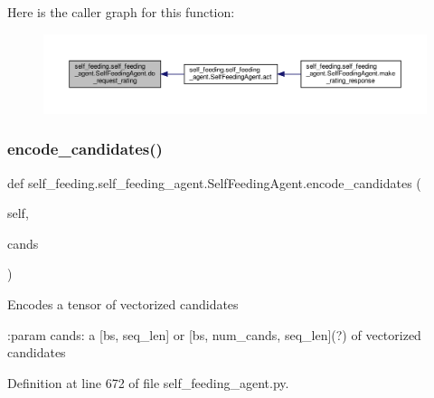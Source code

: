 Here is the caller graph for this function\+:
\nopagebreak
\begin{figure}[H]
\begin{center}
\leavevmode
\includegraphics[width=350pt]{classself__feeding_1_1self__feeding__agent_1_1SelfFeedingAgent_ab0ccbaba9de0874d235a2ce14dd8ead3_icgraph}
\end{center}
\end{figure}
\mbox{\label{classself__feeding_1_1self__feeding__agent_1_1SelfFeedingAgent_ae156bc0076ea687e2d29cb2d1986b5db}} 
\subsubsection{\texorpdfstring{encode\+\_\+candidates()}{encode\_candidates()}}
{\footnotesize\ttfamily def self\+\_\+feeding.\+self\+\_\+feeding\+\_\+agent.\+Self\+Feeding\+Agent.\+encode\+\_\+candidates (\begin{DoxyParamCaption}\item[{}]{self,  }\item[{}]{cands }\end{DoxyParamCaption})}

\begin{DoxyVerb}Encodes a tensor of vectorized candidates

:param cands: a [bs, seq_len] or [bs, num_cands, seq_len](?) of vectorized
    candidates
\end{DoxyVerb}
 

Definition at line 672 of file self\+\_\+feeding\+\_\+agent.\+py.



